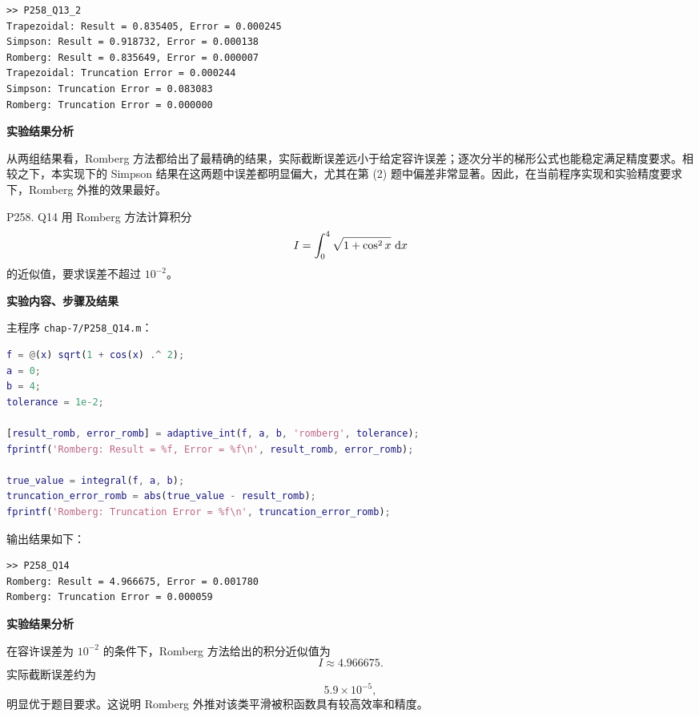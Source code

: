 \documentclass[11pt, a4paper]{ctexart}
\begin{document}
\begin{solution}
\begin{lstlisting}
>> P258_Q13_2
Trapezoidal: Result = 0.835405, Error = 0.000245
Simpson: Result = 0.918732, Error = 0.000138
Romberg: Result = 0.835649, Error = 0.000007
Trapezoidal: Truncation Error = 0.000244
Simpson: Truncation Error = 0.083083
Romberg: Truncation Error = 0.000000
\end{lstlisting}

    \textbf{实验结果分析}

    从两组结果看，Romberg 方法都给出了最精确的结果，实际截断误差远小于给定容许误差；逐次分半的梯形公式也能稳定满足精度要求。相较之下，本实现下的 Simpson 结果在这两题中误差都明显偏大，尤其在第 (2) 题中偏差非常显著。因此，在当前程序实现和实验精度要求下，Romberg 外推的效果最好。
\end{solution}


\begin{problem}{P258. Q14}
    用 Romberg 方法计算积分
    \[
        I=\int_0^4 \sqrt{1+\cos^2 x}\,\,\mathrm{d} x
    \]
    的近似值，要求误差不超过 $10^{-2}$。
\end{problem}

\begin{solution}
    \textbf{实验内容、步骤及结果}

    主程序 \texttt{chap-7/P258\_Q14.m}：

\begin{lstlisting}[language=Matlab]
f = @(x) sqrt(1 + cos(x) .^ 2);
a = 0;
b = 4;
tolerance = 1e-2;

[result_romb, error_romb] = adaptive_int(f, a, b, 'romberg', tolerance);
fprintf('Romberg: Result = %f, Error = %f\n', result_romb, error_romb);

true_value = integral(f, a, b);
truncation_error_romb = abs(true_value - result_romb);
fprintf('Romberg: Truncation Error = %f\n', truncation_error_romb);
\end{lstlisting}

    输出结果如下：

\begin{lstlisting}
>> P258_Q14
Romberg: Result = 4.966675, Error = 0.001780
Romberg: Truncation Error = 0.000059
\end{lstlisting}

    \textbf{实验结果分析}

    在容许误差为 $10^{-2}$ 的条件下，Romberg 方法给出的积分近似值为
    \[
        I\approx 4.966675.
    \]
    实际截断误差约为
    \[
        5.9\times 10^{-5},
    \]
    明显优于题目要求。这说明 Romberg 外推对该类平滑被积函数具有较高效率和精度。
\end{solution}
\end{document}
